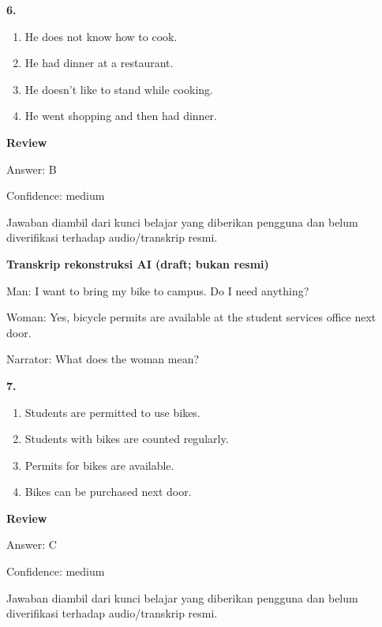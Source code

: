 \documentclass[12pt]{article}
\begin{document}
\noindent\textbf{6.}
\begin{enumerate}[label=(\Alph*),leftmargin=*,itemsep=0.2em]
\item He does not know how to cook.
\item He had dinner at a restaurant.
\item He doesn't like to stand while cooking.
\item He went shopping and then had dinner.
\end{enumerate}
\par
\begingroup
\setlength{\parskip}{0pt}
\setlength{\parindent}{0pt}
\textbf{Review}\par
Answer: B\par
Confidence: medium\par
Jawaban diambil dari kunci belajar yang diberikan pengguna dan belum diverifikasi terhadap audio/transkrip resmi.\par
\endgroup
\par
\vspace{0.25\baselineskip}
\begin{exampleblock}
\textbf{Transkrip rekonstruksi AI (draft; bukan resmi)}\par
Man: I want to bring my bike to campus. Do I need anything?\par
Woman: Yes, bicycle permits are available at the student services office next door.\par
Narrator: What does the woman mean?\par
\end{exampleblock}
\noindent\textbf{7.}
\begin{enumerate}[label=(\Alph*),leftmargin=*,itemsep=0.2em]
\item Students are permitted to use bikes.
\item Students with bikes are counted regularly.
\item Permits for bikes are available.
\item Bikes can be purchased next door.
\end{enumerate}
\par
\begingroup
\setlength{\parskip}{0pt}
\setlength{\parindent}{0pt}
\textbf{Review}\par
Answer: C\par
Confidence: medium\par
Jawaban diambil dari kunci belajar yang diberikan pengguna dan belum diverifikasi terhadap audio/transkrip resmi.\par
\endgroup
\par
\end{document}
